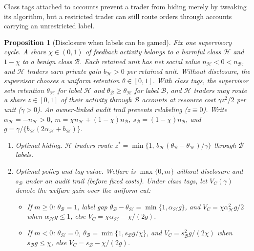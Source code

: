 \documentclass[11pt,letterpaper]{article}
\newtheorem{proposition}[theorem]{Proposition}
\theoremstyle{definition}
\begin{document}
Class tags attached to accounts prevent a trader from hiding merely by tweaking its algorithm, but a restricted trader can still route orders through accounts carrying an unrestricted label.

\begin{proposition}[Disclosure when labels can be gamed]\label{prop:relabeling}
Fix one supervisory cycle. A share $\chi \in (0, 1)$ of feedback activity belongs to a harmful class $\mathcal{H}$ and $1 - \chi$ to a benign class $\mathcal{B}$. Each retained unit has net social value $n_{\mathcal{H}} < 0 < n_{\mathcal{B}}$, and $\mathcal{H}$ traders earn private gain $b_{\mathcal{H}} > 0$ per retained unit. Without disclosure, the supervisor chooses a uniform retention $\theta \in [0, 1]$. With class tags, the supervisor sets retention $\theta_{\mathcal{H}}$ for label $\mathcal{H}$ and $\theta_{\mathcal{B}} \ge \theta_{\mathcal{H}}$ for label $\mathcal{B}$, and $\mathcal{H}$ traders may route a share $z \in [0, 1]$ of their activity through $\mathcal{B}$ accounts at resource cost $\gamma z^2 / 2$ per unit ($\gamma > 0$). An owner-linked audit trail prevents relabeling ($z \equiv 0$). Write $\alpha_{\mathcal{H}} = -n_{\mathcal{H}} > 0$, $m = \chi n_{\mathcal{H}} + (1 - \chi) n_{\mathcal{B}}$, $s_{\mathcal{B}} = (1 - \chi) n_{\mathcal{B}}$, and $g = \gamma / \{b_{\mathcal{H}}(2\alpha_{\mathcal{H}} + b_{\mathcal{H}})\}$.
\begin{enumerate}
  \item[(i)] \emph{Optimal hiding.} $\mathcal{H}$ traders route $z^* = \min\{1,\, b_{\mathcal{H}}(\theta_{\mathcal{B}} - \theta_{\mathcal{H}})/\gamma\}$ through $\mathcal{B}$ labels.
  \item[(ii)] \emph{Optimal policy and tag value.} Welfare is $\max\{0, m\}$ without disclosure and $s_{\mathcal{B}}$ under an audit trail (before fixed costs). Under class tags, let $V_C(\gamma)$ denote the welfare gain over the uniform cut:
  \begin{itemize}
    \item If $m \ge 0$: $\theta_{\mathcal{B}} = 1$, label gap $\theta_{\mathcal{B}} - \theta_{\mathcal{H}} = \min\{1, \alpha_{\mathcal{H}} g\}$, and $V_C = \chi \alpha_{\mathcal{H}}^2 g / 2$ when $\alpha_{\mathcal{H}} g \le 1$, else $V_C = \chi \alpha_{\mathcal{H}} - \chi / (2g)$.
    \item If $m < 0$: $\theta_{\mathcal{H}} = 0$, $\theta_{\mathcal{B}} = \min\{1, s_{\mathcal{B}} g / \chi\}$, and $V_C = s_{\mathcal{B}}^2 g / (2\chi)$ when $s_{\mathcal{B}} g \le \chi$, else $V_C = s_{\mathcal{B}} - \chi / (2g)$.

\end{itemize}
\end{enumerate}
\end{proposition}
\end{document}
